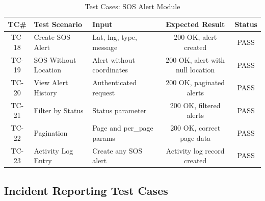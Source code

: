\begin{table}[H]
  \centering
  \caption{Test Cases: SOS Alert Module}
  \label{tab:tc-sos}
  \begin{tabularx}{\textwidth}{@{}c l X c c@{}}
    \toprule
    \textbf{TC\#} & \textbf{Test Scenario} & \textbf{Input} & \textbf{Expected Result} & \textbf{Status} \\
    \midrule
    TC-18 & Create SOS Alert & Lat, lng, type, message & 200 OK, alert created & \textcolor{green!70!black}{PASS} \\
    TC-19 & SOS Without Location & Alert without coordinates & 200 OK, alert with null location & \textcolor{green!70!black}{PASS} \\
    TC-20 & View Alert History & Authenticated request & 200 OK, paginated alerts & \textcolor{green!70!black}{PASS} \\
    TC-21 & Filter by Status & Status parameter & 200 OK, filtered alerts & \textcolor{green!70!black}{PASS} \\
    TC-22 & Pagination & Page and per\_page params & 200 OK, correct page data & \textcolor{green!70!black}{PASS} \\
    TC-23 & Activity Log Entry & Create any SOS alert & Activity log record created & \textcolor{green!70!black}{PASS} \\
    \bottomrule
  \end{tabularx}
\end{table}

\subsection{Incident Reporting Test Cases}

